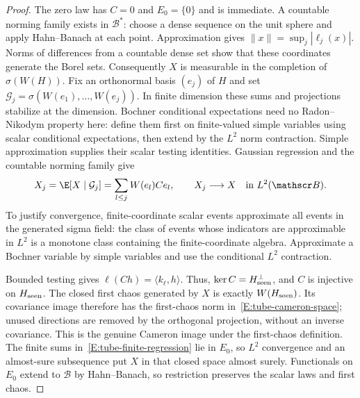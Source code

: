 \begin{proof}
  The zero law has $C=0$ and $E_0=\{0\}$ and is immediate.
  A countable norming family exists in $\mathscr B^*$:
  choose a dense sequence on the unit sphere and apply Hahn--Banach
  at each point. Approximation gives
  $\|x\|=\sup_j|\ell_j(x)|$.
  Norms of differences from a countable dense set show that these
  coordinates generate the Borel sets.
  Consequently $X$ is measurable in the completion of $\sigma(W(H))$.
  Fix an orthonormal basis $(e_j)$ of $H$ and set
  $\mathcal G_j=\sigma(W(e_1),\ldots,W(e_j))$.
  In finite dimension these sums and projections stabilize at the dimension.
  Bochner conditional expectations need no Radon--Nikodym property here:
  define them first on finite-valued simple variables using scalar
  conditional expectations, then extend by the $L^2$ norm contraction.
  Simple approximation supplies their scalar testing identities.
  Gaussian regression and the countable norming family give
  \begin{equation}\label{E:tube-finite-regression}
    X_j=\E[X\mid\mathcal G_j]
    =\sum_{l\le j}W(e_l)Ce_l,\qquad X_j\longrightarrow X
    \quad\hbox{in }L^2(\mathscr B).
  \end{equation}
  To justify convergence, finite-coordinate scalar events approximate
  all events in the generated sigma field: the class of events whose
  indicators are approximable in $L^2$ is a monotone class containing
  the finite-coordinate algebra. Approximate a Bochner variable by
  simple variables and use the conditional $L^2$ contraction.

  Bounded testing gives $\ell(Ch)=\langle k_\ell,h\rangle$.
  Thus, $\ker C=H_{\rm seen}^\perp$, and $C$ is injective on
  $H_{\rm seen}$. The closed first chaos generated by $X$ is
  exactly $W(H_{\rm seen})$.
  Its covariance image therefore has the first-chaos norm
  in~\eqref{E:tube-cameron-space}; unused directions are removed
  by the orthogonal projection, without an inverse covariance.
  This is the genuine Cameron image under the first-chaos definition.
  The finite sums in~\eqref{E:tube-finite-regression} lie in
  $E_0$, so $L^2$ convergence and an almost-sure subsequence
  put $X$ in that closed space almost surely.
  Functionals on $E_0$ extend to $\mathscr B$ by Hahn--Banach,
  so restriction preserves the scalar laws and first chaos.


\end{proof}
